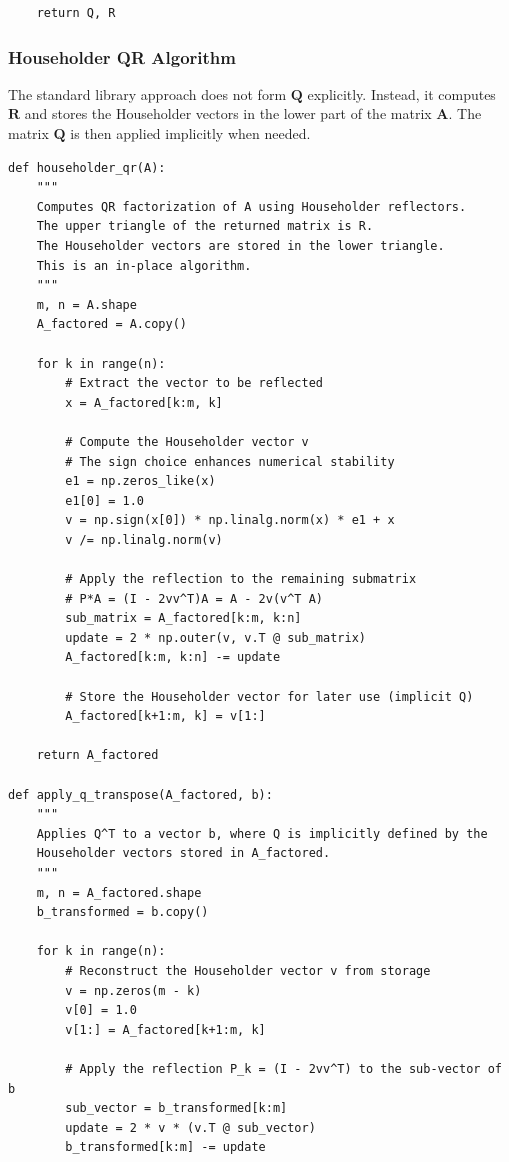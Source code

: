 \begin{proposition}
\begin{verbatim}
    return Q, R
\end{verbatim}

\subsubsection*{Householder QR Algorithm}
The standard library approach does not form $\mathbf{Q}$ explicitly. Instead, it computes $\mathbf{R}$ and stores the Householder vectors in the lower part of the matrix $\mathbf{A}$. The matrix $\mathbf{Q}$ is then applied implicitly when needed.

\begin{verbatim}
def householder_qr(A):
    """
    Computes QR factorization of A using Householder reflectors.
    The upper triangle of the returned matrix is R.
    The Householder vectors are stored in the lower triangle.
    This is an in-place algorithm.
    """
    m, n = A.shape
    A_factored = A.copy()
    
    for k in range(n):
        # Extract the vector to be reflected
        x = A_factored[k:m, k]
        
        # Compute the Householder vector v
        # The sign choice enhances numerical stability
        e1 = np.zeros_like(x)
        e1[0] = 1.0
        v = np.sign(x[0]) * np.linalg.norm(x) * e1 + x
        v /= np.linalg.norm(v)
        
        # Apply the reflection to the remaining submatrix
        # P*A = (I - 2vv^T)A = A - 2v(v^T A)
        sub_matrix = A_factored[k:m, k:n]
        update = 2 * np.outer(v, v.T @ sub_matrix)
        A_factored[k:m, k:n] -= update
        
        # Store the Householder vector for later use (implicit Q)
        A_factored[k+1:m, k] = v[1:]
        
    return A_factored

def apply_q_transpose(A_factored, b):
    """
    Applies Q^T to a vector b, where Q is implicitly defined by the
    Householder vectors stored in A_factored.
    """
    m, n = A_factored.shape
    b_transformed = b.copy()
    
    for k in range(n):
        # Reconstruct the Householder vector v from storage
        v = np.zeros(m - k)
        v[0] = 1.0
        v[1:] = A_factored[k+1:m, k]
        
        # Apply the reflection P_k = (I - 2vv^T) to the sub-vector of b
        sub_vector = b_transformed[k:m]
        update = 2 * v * (v.T @ sub_vector)
        b_transformed[k:m] -= update
        

\end{verbatim}
\end{proposition}
